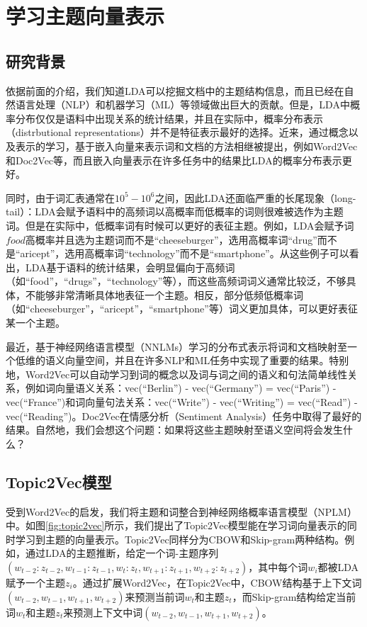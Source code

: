 \documentclass[master]{njuthesis}
\begin{document}
\section{学习主题向量表示}\label{sec_chap3_topic2vec}

\subsection{研究背景}
依据前面的介绍，我们知道LDA可以挖掘文档中的主题结构信息，而且已经在自然语言处理（NLP）和机器学习（ML）等领域做出巨大的贡献\cite{blei2003latent}。但是，LDA中概率分布仅仅是语料中出现关系的统计结果，并且在实际中，概率分布表示（distrbutional representations）并不是特征表示最好的选择。近来，通过概念以及表示的学习，基于嵌入向量来表示词和文档的方法相继被提出，例如Word2Vec\cite{mikolov2013efficient}和Doc2Vec\cite{le2014distributed}等，而且嵌入向量表示在许多任务中的结果比LDA的概率分布表示更好。

同时，由于词汇表通常在$10^5-10^6$之间，因此LDA还面临严重的长尾现象（long-tail）：LDA会赋予语料中的高频词以高概率而低概率的词则很难被选作为主题词。但是在实际中，低概率词有时候可以更好的表征主题。例如，LDA会赋予词$food$高概率并且选为主题词而不是``cheeseburger''，选用高概率词``drug''而不是``aricept''，选用高概率词``technology''而不是``smartphone''。从这些例子可以看出，LDA基于语料的统计结果，会明显偏向于高频词（如``food''，``drugs''，``technology''等），而这些高频词词义通常比较泛，不够具体，不能够非常清晰具体地表征一个主题。相反，部分低频低概率词（如``cheeseburger''，``aricept''，``smartphone''等）词义更加具体，可以更好表征某一个主题。

最近，基于神经网络语言模型（NNLMs）学习的分布式表示将词和文档映射至一个低维的语义向量空间，并且在许多NLP和ML任务中实现了重要的结果\cite{mikolov2013efficient,le2014distributed}。特别地，Word2Vec可以自动学习到词的概念以及词与词之间的语义和句法简单线性关系，例如词向量语义关系：vec(``Berlin'') - vec(``Germany'') = vec(``Paris'') - vec(``France'')和词向量句法关系：vec(``Write'') - vec(``Writing'') = vec(``Read'') - vec(``Reading'')\cite{mikolov2013linguistic}。Doc2Vec在情感分析（Sentiment Analysis）任务中取得了最好的结果\cite{le2014distributed}。自然地，我们会想这个问题：如果将这些主题映射至语义空间将会发生什么？

\subsection{Topic2Vec模型}

受到Word2Vec的启发，我们将主题和词整合到神经网络概率语言模型（NPLM）中。如图\ref{fig:topic2vec}所示，我们提出了Topic2Vec模型能在学习词向量表示的同时学习到主题的向量表示。Topic2Vec同样分为CBOW和Skip-gram两种结构。例如，通过LDA的主题推断，给定一个词-主题序列$(w_{t-2}:z_{t-2}, w_{t-1}:z_{t-1}, w_t:z_t, w_{t+1}:z_{t+1}, w_{t+2}:z_{t+2})$，其中每个词$w_i$都被LDA赋予一个主题$z_i$。通过扩展Word2Vec，在Topic2Vec中，CBOW结构基于上下文词$(w_{t-2}, w_{t-1}, w_{t+1}, w_{t+2})$来预测当前词$w_t$和主题$z_t$，而Skip-gram结构给定当前词$w_t$和主题$z_t$来预测上下文中词$(w_{t-2}, w_{t-1}, w_{t+1}, w_{t+2})$。
\end{document}
